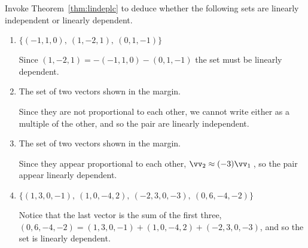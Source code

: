 \begin{example} \label{eg:}
Invoke Theorem~\ref{thm:lindeplc} to deduce whether the following sets are linearly independent or linearly dependent.
\begin{enumerate}
\item \(\{(-1,1,0),\ (1,-2,1),\ (0,1,-1)\}\)
\begin{solution} 
Since \((1,-2,1)=-(-1,1,0)-(0,1,-1)\) the set must be linearly dependent.
\end{solution}

\item The set of two vectors shown in the margin.
\begin{solution} 
Since they are not proportional to each other, we cannot write either as a multiple of the other, and so the pair are linearly independent. 
\end{solution}

\item The set of two vectors shown in the margin.
\begin{solution} 
Since they appear proportional to each other, \(\vv_2\approx (-3)\vv_1\)\,,  so the pair appear linearly dependent. 
\end{solution}

\item \(\{(1,3,0,-1),\ (1,0,-4,2),\ (-2,3,0,-3),\ (0,6,-4,-2)\}\)
\begin{solution} 
Notice that the last vector is the sum of the first three, \((0,6,-4,-2)=(1,3,0,-1)+(1,0,-4,2)+(-2,3,0,-3)\), and so the set is linearly dependent. 
\end{solution}

\end{enumerate}
\end{example}




